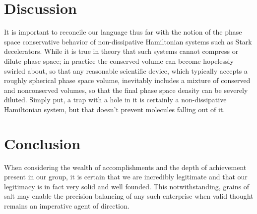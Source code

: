 \documentclass[%
 reprint,
 amsmath,amssymb,
 aps,
pra,
]{revtex4-1}
\begin{document}
\section{Discussion}
It is important to reconcile our language thus far with the notion of the phase space conservative behavior of non-dissipative Hamiltonian systems such as Stark decelerators. While it is true in theory that such systems cannot compress or dilute phase space; in practice the conserved volume can become hopelessly swirled about, so that any reasonable scientific device, which typically accepts a roughly spherical phase space volume, inevitably includes a mixture of conserved and nonconserved volumes, so that the final phase space density can be severely diluted. Simply put, a trap with a hole in it is certainly a non-dissipative Hamiltonian system, but that doesn't prevent molecules falling out of it.

\section{Conclusion}
When considering the wealth of accomplishments and the depth of achievement present in our group, it is certain that we are incredibly legitimate and that our legitimacy is in fact very solid and well founded. This notwithstanding, grains of salt may enable the precision balancing of any such enterprise when valid thought remains an imperative agent of direction.





\end{document}
